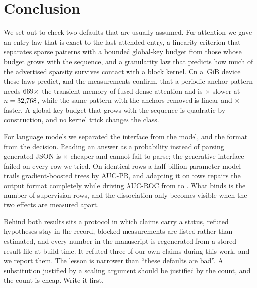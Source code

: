 \section{Conclusion}\label{sec:conclusion}

We set out to check two defaults that are usually assumed. For attention we gave
an entry law that is exact to the last attended entry, a linearity criterion that
separates sparse patterns with a bounded global-key budget from those whose budget
grows with the sequence, and a granularity law that predicts how much of the
advertised sparsity survives contact with a block kernel. On a
\GpuMemGiB\,GiB device these laws predict, and the measurements confirm, that a
periodic-anchor pattern needs $669\times$ the transient memory of fused
dense attention and is \LatencySlowdownVsSdpa$\times$ slower at
$n=32{,}768$, while the same pattern with the anchors removed is linear and
\LatSlidingRatio$\times$ faster. A global-key budget that grows with the sequence
is quadratic by construction, and no kernel trick changes the class.

For language models we separated the interface from the model, and the format from
the decision. Reading an answer as a probability instead of parsing generated JSON
is \InterfaceRatio$\times$ cheaper and cannot fail to parse; the generative
interface failed on every row we tried. On identical rows a half-billion-parameter
model trails gradient-boosted trees by \LlmDelta{} AUC-PR, and adapting it on
\SftRows{} rows repairs the output format completely while driving AUC-ROC from
\LlmAucRoc{} to \SftAucRoc. What binds is the number of supervision rows, and the
dissociation only becomes visible when the two effects are measured apart.

Behind both results sits a protocol in which claims carry a status, refuted
hypotheses stay in the record, blocked measurements are listed rather than
estimated, and every number in the manuscript is regenerated from a stored result
file at build time. It refuted three of our own claims during this work, and we
report them. The lesson is narrower than ``these defaults are bad''. A
substitution justified by a scaling argument should be justified by the count, and
the count is cheap. Write it first.
